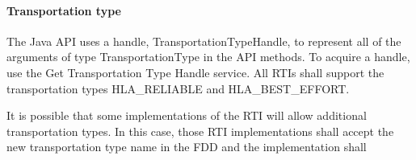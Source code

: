 \begin{compactstdpage}
    \paragraph{Transportation type}

    The Java API uses a handle, TransportationTypeHandle, to represent all of the arguments of type TransportationType in the API methods. To acquire a handle, use the Get Transportation Type Handle service. All RTIs shall support the transportation types HLA\_RELIABLE and HLA\_BEST\_EFFORT.

    It is possible that some implementations of the RTI will allow additional transportation types. In this case, those RTI implementations shall accept the new transportation type name in the FDD and the implementation shall

\end{compactstdpage}

\clearpage

